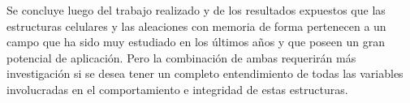 \documentclass[a4paper,12pt,fleqn,twoside,openany]{book}
\begin{document}
Se concluye luego del trabajo realizado y de los resultados expuestos que las estructuras celulares y las aleaciones con memoria de forma pertenecen a un campo que ha sido muy estudiado en los últimos años y que poseen un gran potencial de aplicación. Pero la combinación de ambas requerirán más investigación si se desea tener un completo entendimiento de todas las variables involucradas en el comportamiento e integridad de estas estructuras. 


 




\end{document}
